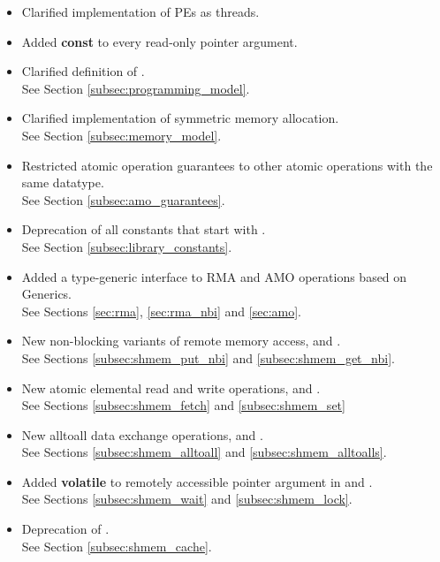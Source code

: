 \begin{itemize}
%
\item Clarified implementation of \ac{PE}s as threads.
%
\item Added \textbf{const} to every read-only pointer argument.
%
\item Clarified definition of .
\\See Section \ref{subsec:programming_model}.
%
\item Clarified implementation of symmetric memory allocation.
\\See Section \ref{subsec:memory_model}.
%
\item Restricted atomic operation guarantees to other atomic operations with the same datatype.
\\See Section \ref{subsec:amo_guarantees}.
%
\item Deprecation of all constants that start with .
\\See Section \ref{subsec:library_constants}.
%
\item Added a type-generic interface to \openshmem \ac{RMA} and \ac{AMO}
	operations based on \Celev{} Generics.
\\See Sections \ref{sec:rma}, \ref{sec:rma_nbi} and \ref{sec:amo}.
%
\item New non-blocking variants of remote memory access, 
	and .
\\See Sections \ref{subsec:shmem_put_nbi} and \ref{subsec:shmem_get_nbi}.
%
\item New atomic elemental read and write operations,  and
	.
\\See Sections \ref{subsec:shmem_fetch} and \ref{subsec:shmem_set}
%
\item New alltoall data exchange operations,  
	and .
\\See Sections \ref{subsec:shmem_alltoall} and \ref{subsec:shmem_alltoalls}.
%
\item Added \textbf{volatile} to remotely accessible pointer argument in 
	 and .
\\See Sections \ref{subsec:shmem_wait} and \ref{subsec:shmem_lock}.
%
\item Deprecation of .
\\See Section \ref{subsec:shmem_cache}.
%
\end{itemize}




